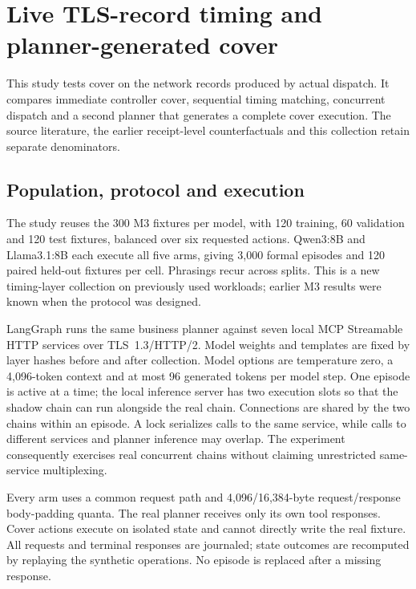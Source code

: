 \section{Live TLS-record timing and planner-generated cover}\label{supp:live-timing}
This study tests cover on the network records produced by actual dispatch. It compares immediate controller cover, sequential timing matching, concurrent dispatch and a second planner that generates a complete cover execution. The source literature, the earlier receipt-level counterfactuals and this collection retain separate denominators.

\subsection{Population, protocol and execution}
The study reuses the 300 M3 fixtures per model, with 120 training, 60 validation and 120 test fixtures, balanced over six requested actions. Qwen3:8B and Llama3.1:8B each execute all five arms, giving 3,000 formal episodes and 120 paired held-out fixtures per cell. Phrasings recur across splits. This is a new timing-layer collection on previously used workloads; earlier M3 results were known when the protocol was designed.

LangGraph runs the same business planner against seven local MCP Streamable HTTP services over TLS~1.3/HTTP/2. Model weights and templates are fixed by layer hashes before and after collection. Model options are temperature zero, a 4,096-token context and at most 96 generated tokens per model step. One episode is active at a time; the local inference server has two execution slots so that the shadow chain can run alongside the real chain. Connections are shared by the two chains within an episode. A lock serializes calls to the same service, while calls to different services and planner inference may overlap. The experiment consequently exercises real concurrent chains without claiming unrestricted same-service multiplexing.

Every arm uses a common  request path and 4,096/16,384-byte request/response body-padding quanta. The real planner receives only its own tool responses. Cover actions execute on isolated state and cannot directly write the real fixture. All requests and terminal responses are journaled; state outcomes are recomputed by replaying the synthetic operations. No episode is replaced after a missing response.

